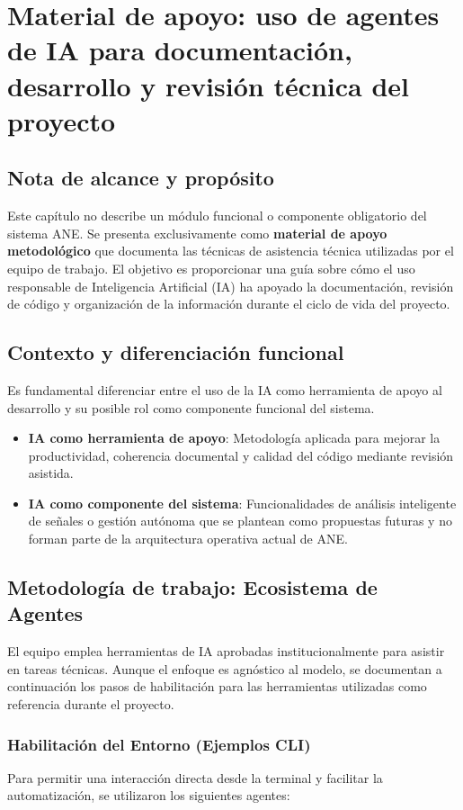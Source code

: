 \chapter{Material de apoyo: uso de agentes de IA para documentación, desarrollo y revisión técnica del proyecto}
\label{annex:ia_collaboration}

\section{Nota de alcance y propósito}
Este capítulo no describe un módulo funcional o componente obligatorio del sistema ANE. Se presenta exclusivamente como \textbf{material de apoyo metodológico} que documenta las técnicas de asistencia técnica utilizadas por el equipo de trabajo. El objetivo es proporcionar una guía sobre cómo el uso responsable de Inteligencia Artificial (IA) ha apoyado la documentación, revisión de código y organización de la información durante el ciclo de vida del proyecto.

\section{Contexto y diferenciación funcional}
Es fundamental diferenciar entre el uso de la IA como herramienta de apoyo al desarrollo y su posible rol como componente funcional del sistema.
\begin{itemize}
    \item \textbf{IA como herramienta de apoyo}: Metodología aplicada para mejorar la productividad, coherencia documental y calidad del código mediante revisión asistida.
    \item \textbf{IA como componente del sistema}: Funcionalidades de análisis inteligente de señales o gestión autónoma que se plantean como propuestas futuras y no forman parte de la arquitectura operativa actual de ANE.
\end{itemize}

\section{Metodología de trabajo: Ecosistema de Agentes}
El equipo emplea herramientas de IA aprobadas institucionalmente para asistir en tareas técnicas. Aunque el enfoque es agnóstico al modelo, se documentan a continuación los pasos de habilitación para las herramientas utilizadas como referencia durante el proyecto.

\subsection{Habilitación del Entorno (Ejemplos CLI)}
Para permitir una interacción directa desde la terminal y facilitar la automatización, se utilizaron los siguientes agentes:

